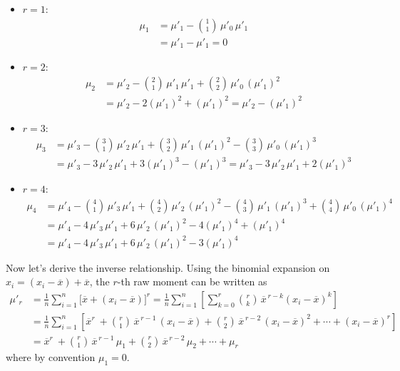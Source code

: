 \documentclass[twoside]{book}
\begin{document}
\begin{itemize}
  \item \(r=1:\)
    \begin{align*}
      \mu_1
      &= \mu'_1 - \binom{1}{1}\,\mu'_0\,\mu'_1 \\
      &= \mu'_1 - \mu'_1 = 0
    \end{align*}
    
  
  \item \(r=2:\)
    \begin{align*}
      \mu_2
      &= \mu'_2 
         - \binom{2}{1}\,\mu'_1\,\mu'_1
         + \binom{2}{2}\,\mu'_0\,(\mu'_1)^2 \\
      &= \mu'_2 - 2(\mu'_1)^2 + (\mu'_1)^2
      = \mu'_2 - (\mu'_1)^2
    \end{align*}
    
  
  \item \(r=3:\)
    \begin{align*}
      \mu_3
      &= \mu'_3
         - \binom{3}{1}\,\mu'_2\,\mu'_1
         + \binom{3}{2}\,\mu'_1\,(\mu'_1)^2
         - \binom{3}{3}\,\mu'_0\,(\mu'_1)^3 \\
      &= \mu'_3 - 3\,\mu'_2\,\mu'_1 + 3(\mu'_1)^3 - (\mu'_1)^3
      = \mu'_3 - 3\,\mu'_2\,\mu'_1 + 2(\mu'_1)^3
    \end{align*}
    
  
  \item \(r=4:\)
    \begin{align*}
      \mu_4
      &= \mu'_4
         - \binom{4}{1}\,\mu'_3\,\mu'_1
         + \binom{4}{2}\,\mu'_2\,(\mu'_1)^2
         - \binom{4}{3}\,\mu'_1\,(\mu'_1)^3
         + \binom{4}{4}\,\mu'_0\,(\mu'_1)^4 \\
      &= \mu'_4 - 4\,\mu'_3\,\mu'_1 + 6\,\mu'_2\,(\mu'_1)^2 - 4(\mu'_1)^4 + (\mu'_1)^4 \\
      &= \mu'_4 - 4\,\mu'_3\,\mu'_1 + 6\,\mu'_2\,(\mu'_1)^2 - 3(\mu'_1)^4
    \end{align*}
    
\end{itemize}

Now let's derive the inverse relationship. Using the binomial expansion on \(x_i = (x_i - \overline{x}) + \overline{x}\), the \(r\)-th raw moment can be written as
\begin{align*}
\mu'_r
&= \frac{1}{n}\sum_{i=1}^n \bigl[\overline{x}+ (x_i - \overline{x})\bigr]^r
= \frac{1}{n}\sum_{i=1}^n\left[\sum_{k=0}^r \binom{r}{k}\,\overline{x}^{\,r-k} (x_i - \overline{x})^k\right]\\
&= \frac{1}{n}\sum_{i=1}^n\left[\overline{x}^r\
+ \binom{r}{1}\,\overline{x}^{\,r-1}\,(x_i - \overline{x})
+ \binom{r}{2}\,\overline{x}^{\,r-2}\,(x_i - \overline{x})^2
+ \cdots
+ (x_i - \overline{x})^r\right]\\
&= \overline{x}^r\
+ \binom{r}{1}\,\overline{x}^{\,r-1}\,\mu_1
+ \binom{r}{2}\,\overline{x}^{\,r-2}\,\mu_2
+ \cdots
+ \mu_r
\end{align*}
where by convention \(\mu_1 = 0\).
\end{document}
